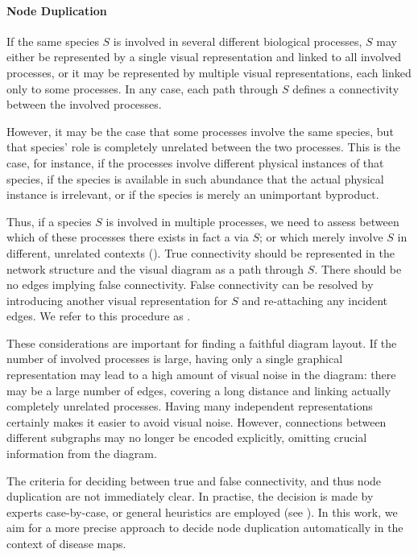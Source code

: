 \documentclass[
	fontsize=10pt, %
	twoside=false, %
	secnumdepth=1, %
  toc=indentunnumbered %
]{kaobook}
\begin{document}
\paragraph{Node Duplication}

If the same species $S$ is involved in several different biological processes,
$S$ may either be represented by a single visual representation and linked to
all involved processes, or it may be represented by multiple visual
representations, each linked only to some processes.
%
In any case, each path through $S$ defines a connectivity
between the involved processes.

However, it may be the case that some processes involve the same
species, but that species' role is completely unrelated between the two
processes. This is the case, for instance, if the processes involve different
physical instances of that species, if the species is available in such
abundance that the actual physical instance is irrelevant, or if the species is
merely an unimportant byproduct.

Thus, if a species $S$ is involved in multiple processes, we need to assess
between which of these processes there exists in fact a 
via $S$; or which merely involve $S$ in different, unrelated contexts
().
%
True connectivity should be represented in the network structure and the visual
diagram as a path through $S$. There should be no edges implying false
connectivity.
False connectivity can be resolved by introducing another visual representation
for $S$ and re-attaching any incident edges. We refer to this procedure as
.

These considerations are important for finding a faithful diagram layout.
If the number of involved processes is large, having only a single graphical
representation may lead to a high amount of visual noise in the diagram: there
may be a large number of edges, covering a long distance and linking actually
completely unrelated processes.
%
Having many independent representations
certainly makes it easier to avoid visual noise. However, connections between
different subgraphs may no longer be encoded explicitly, omitting crucial
information from the diagram.

The criteria for deciding between true and false connectivity, and thus node
duplication are not immediately clear. In practise, the decision is made by
experts case-by-case, or general heuristics are employed (see
). In this work, we aim for a more precise approach to
decide node duplication automatically in the context of disease maps.
\end{document}
